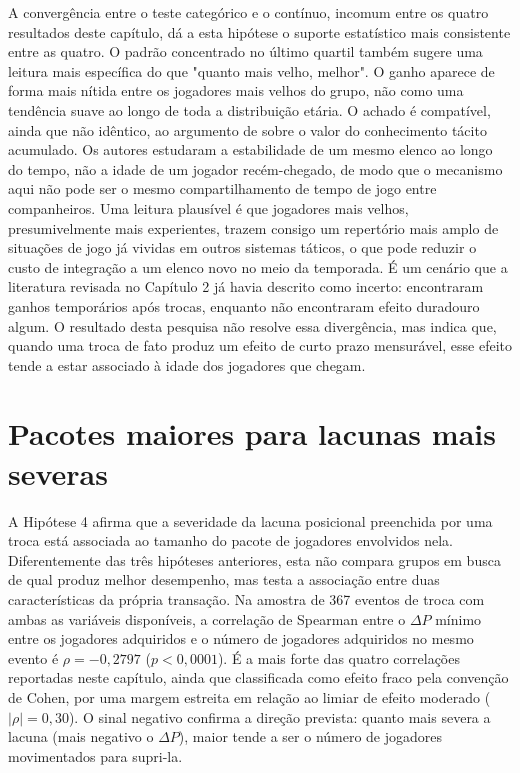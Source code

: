 A convergência entre o teste categórico e o contínuo, incomum entre os quatro resultados deste capítulo, dá a esta hipótese o suporte estatístico mais consistente entre as quatro. O padrão concentrado no último quartil também sugere uma leitura mais específica do que "quanto mais velho, melhor". O ganho aparece de forma mais nítida entre os jogadores mais velhos do grupo, não como uma tendência suave ao longo de toda a distribuição etária. O achado é compatível, ainda que não idêntico, ao argumento de \citet{berman2002} sobre o valor do conhecimento tácito acumulado. Os autores estudaram a estabilidade de um mesmo elenco ao longo do tempo, não a idade de um jogador recém-chegado, de modo que o mecanismo aqui não pode ser o mesmo compartilhamento de tempo de jogo entre companheiros. Uma leitura plausível é que jogadores mais velhos, presumivelmente mais experientes, trazem consigo um repertório mais amplo de situações de jogo já vividas em outros sistemas táticos, o que pode reduzir o custo de integração a um elenco novo no meio da temporada. É um cenário que a literatura revisada no Capítulo 2 já havia descrito como incerto: \citet{mcteer1995} encontraram ganhos temporários após trocas, enquanto \citet{audas2002} não encontraram efeito duradouro algum. O resultado desta pesquisa não resolve essa divergência, mas indica que, quando uma troca de fato produz um efeito de curto prazo mensurável, esse efeito tende a estar associado à idade dos jogadores que chegam.

\section{Pacotes maiores para lacunas mais severas}
\label{sec:r_h4}

A Hipótese 4 afirma que a severidade da lacuna posicional preenchida por uma troca está associada ao tamanho do pacote de jogadores envolvidos nela. Diferentemente das três hipóteses anteriores, esta não compara grupos em busca de qual produz melhor desempenho, mas testa a associação entre duas características da própria transação. Na amostra de 367 eventos de troca com ambas as variáveis disponíveis, a correlação de Spearman entre o $\Delta P$ mínimo entre os jogadores adquiridos e o número de jogadores adquiridos no mesmo evento é $\rho = -0{,}2797$ ($p < 0{,}0001$). É a mais forte das quatro correlações reportadas neste capítulo, ainda que classificada como efeito fraco pela convenção de Cohen, por uma margem estreita em relação ao limiar de efeito moderado ($|\rho| = 0{,}30$). O sinal negativo confirma a direção prevista: quanto mais severa a lacuna (mais negativo o $\Delta P$), maior tende a ser o número de jogadores movimentados para supri-la.

